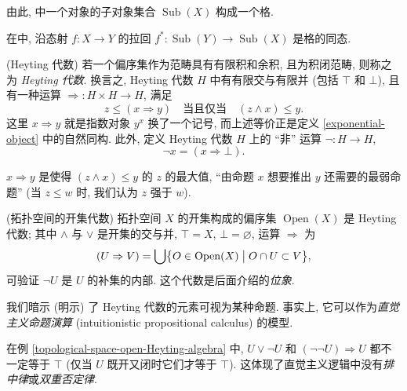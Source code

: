 由此, \topos{}中一个对象的子对象集合 $\operatorname{Sub}(X)$ 构成一个格.

\begin{prop}
	{}
	在\topos{}中, 沿态射 $f\colon X \to Y$ 的拉回 $f^*\colon \operatorname{Sub}(Y)\to \operatorname{Sub}(X)$ 是格的同态.
\end{prop}



\begin{definition}
	{(Heyting 代数)}
	若一个偏序集作为范畴具有有限积和余积, 且为积闭范畴, 则称之为 \emph{Heyting 代数}.
	换言之, Heyting 代数 $H$ 中有有限交与有限并 (包括 $\top$ 和 $\bot$), 且有一种运算 $\Rightarrow\colon H\times H\to H$, 满足
	$$
	z \leq (x\Rightarrow y)\quad \text{当且仅当}\quad (z\wedge x) \leq y.
	$$
	这里 $x\Rightarrow y$ 就是指数对象 $y^x$ 换了一个记号, 而上述等价正是定义 \ref{exponential-object} 中的自然同构. 此外, 定义 Heyting 代数 $H$ 上的 ``非'' 运算 $\neg\colon H\to H$,
	$$
	\neg x = (x\Rightarrow \bot).
	$$
\end{definition}

\begin{remark}
	{}
	$x\Rightarrow y$ 是使得 $(z\wedge x)\leq y$ 的 $z$ 的最大值,
	``由命题 $x$ 想要推出 $y$ 还需要的最弱命题'' (当 $z\leq w$ 时, 我们认为 $z$ 强于 $w$).
\end{remark}

\begin{example}
	[label={topological-space-open-Heyting-algebra}]
	{(拓扑空间的开集代数)}
	拓扑空间 $X$ 的开集构成的偏序集 $\operatorname{Open}(X)$ 是 Heyting 代数; 其中 $\land$ 与 $\lor$ 是开集的交与并, $\top =X$, $\bot=\varnothing$, 运算 $\Rightarrow$ 为
	$$
	(U\Rightarrow V) = \bigcup
	\bigl\{
		O\in \operatorname{Open}(X) \bigm| O\cap U\subset V
	\bigr\},
	$$
	可验证 $\neg U$ 是 $U$ 的补集的内部.
	这个代数是后面介绍的\emph{位象}.
\end{example}

\begin{remark}
	{}
	我们暗示 (明示) 了 Heyting 代数的元素可视为某种命题. 事实上, 它可以作为\emph{直觉主义命题演算} (intuitionistic propositional calculus) 的模型.
	
	在例 \ref{topological-space-open-Heyting-algebra} 中,
	$U \lor \neg U$ 和 $(\neg\neg U) \Rightarrow U$ 都不一定等于 $\top$ (仅当 $U$ 既开又闭时它们才等于 $\top$).
	这体现了直觉主义逻辑中没有\emph{排中律}或\emph{双重否定律}.
\end{remark}

